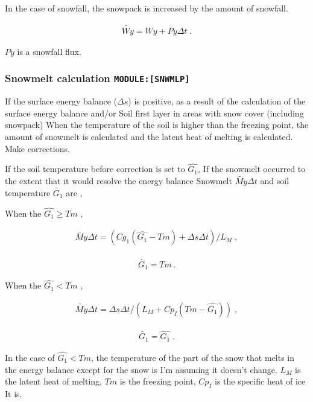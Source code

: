 In the case of snowfall, the snowpack is increased by the amount of
snowfall.

\begin{eqnarray}
\tilde{Wy} = Wy + Py \Delta t \; .
\end{eqnarray}

\(Py\) is a snowfall flux.

\hypertarget{snowmelt-calculation-modulesnwmlp}{%
\subsubsection{\texorpdfstring{Snowmelt calculation
\texttt{MODULE:{[}SNWMLP{]}}}{Snowmelt calculation MODULE:{[}SNWMLP{]}}}\label{snowmelt-calculation-modulesnwmlp}}

If the surface energy balance (\(\Delta s\)) is positive, as a result of
the calculation of the surface energy balance and/or Soil first layer in
areas with snow cover (including snowpack) When the temperature of the
soil is higher than the freezing point, the amount of snowmelt is
calculated and the latent heat of melting is calculated. Make
corrections.

If the soil temperature before correction is set to \(\hat{G_1}\), If
the snowmelt occurred to the extent that it would resolve the energy
balance Snowmelt \(\tilde{My} \Delta t\) and soil temperature
\(\tilde{G_1}\) are ,

When the \(\hat{G_1} \ge Tm\) ,

\begin{eqnarray}
\tilde{My} \Delta t = ( Cg_1 ( \hat{G_1} - Tm ) + \Delta s \Delta t ) / L_M \; ,
\end{eqnarray}

\begin{eqnarray}
\tilde{G_1} = Tm \, .
\end{eqnarray}

When the \(\hat{G_1} < Tm\) ,

\begin{eqnarray}
\tilde{My} \Delta t = \Delta s \Delta t / ( L_M + Cp_I ( Tm - \hat{G_1} ) ) \; ,
\end{eqnarray}

\begin{eqnarray}
\tilde{G_1} = \hat{G_1} \; .
\end{eqnarray}

In the case of \(\hat{G_1} < Tm\), the temperature of the part of the
snow that melts in the energy balance except for the snow is I'm
assuming it doesn't change. \(L_M\) is the latent heat of melting,
\(Tm\) is the freezing point, \(Cp_I\) is the specific heat of ice It
is.

